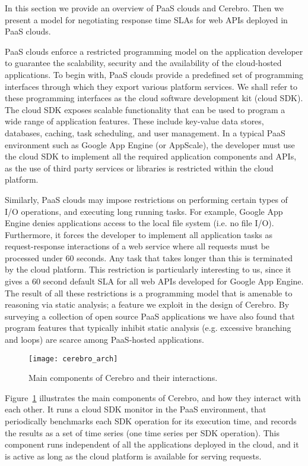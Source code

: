 In this section we provide an overview of PaaS clouds and Cerebro. Then we present a model for 
negotiating response time SLAs for web APIs deployed in PaaS clouds.

PaaS clouds enforce a restricted programming model on the application developer to guarantee
the scalability, security and the availability of the cloud-hosted applications. To begin with,
PaaS clouds provide a predefined set of programming interfaces through which they export 
various platform services. We shall refer to these programming interfaces as the cloud software
development kit (cloud SDK). The cloud SDK exposes scalable functionality that can be used to 
program a wide range of application features. These include key-value data stores, databases, 
caching, task scheduling, and user management. In a typical PaaS environment
such as Google App Engine (or AppScale), the developer must use the cloud SDK to implement
all the required application components and APIs, as the use of third party services or libraries is
restricted within the cloud platform. 

Similarly, PaaS clouds may impose restrictions on performing
certain types of I/O operations, and executing long running tasks. For example, Google App Engine
denies applications access to the local file system (i.e. no file I/O). Furthermore, it forces the
developer to implement all application tasks as request-response interactions of a web service
where all requests must be processed
under 60 seconds. Any task that takes longer than this is terminated by the cloud platform.
This restriction is particularly interesting to us, since it gives a 60 second default SLA
for all web APIs developed for Google App Engine.
The result of all these restrictions is a programming model that is
amenable to reasoning via static analysis; a feature we exploit in the design of Cerebro. By surveying
a collection of open source PaaS applications we have also found that program features that typically
inhibit static analysis (e.g. excessive branching and loops) are scarce among PaaS-hosted
applications.

\begin{figure}
\centering
\texttt{[image: cerebro\_arch]}
\caption{Main components of Cerebro and their interactions.}
\label{fig:cerebro_arch}
\vspace{-0.2in}
\end{figure}

Figure~\ref{fig:cerebro_arch} illustrates the main components of Cerebro, and how they interact with
each other. It runs a cloud SDK monitor in the PaaS environment, that periodically benchmarks each
SDK operation for its execution time, and records the results as a set of time series (one time series 
per SDK operation). 
This component runs independent of all the applications deployed in the cloud, and it is active as long
as the cloud platform is available for serving requests. 

